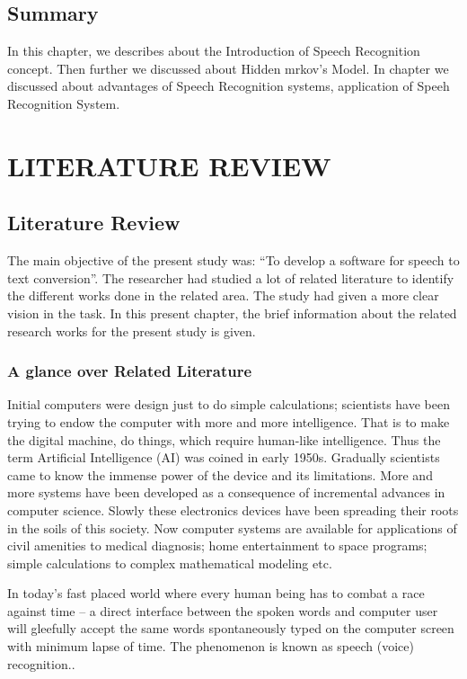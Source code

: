 \documentclass[12pt,a4paper,oldfontcommands]{memoir}
\begin{document}
\section{Summary}
In this chapter, we describes about the Introduction of Speech Recognition concept. Then further we discussed about Hidden mrkov's Model. In chapter we discussed about advantages of Speech Recognition systems, application of Speeh Recognition System.

\chapter{LITERATURE REVIEW}
\section{Literature Review}
The main objective of the present study was: “To develop a software for speech to
text conversion”. The researcher had studied a lot of related literature to identify the
different works done in the related area. The study had given a more clear vision in
the task. In this present chapter, the brief information about the related research works
for the present study is given.
\subsection{A glance over Related Literature}
Initial computers were design just to do simple calculations; scientists have been
trying to endow the computer with more and more intelligence. That is to make the
digital machine, do things, which require human-like intelligence. Thus the term
Artificial Intelligence (AI) was coined in early 1950s. Gradually scientists came to
know the immense power of the device and its limitations. More and more systems
have been developed as a consequence of incremental advances in computer science.
Slowly these electronics devices have been spreading their roots in the soils of this
society. Now computer systems are available for applications of civil amenities to
medical diagnosis; home entertainment to space programs; simple calculations to
complex mathematical modeling etc\cite{21}.

In today’s fast placed world where every human being has to combat a race against
time – a direct interface between the spoken words and computer user will gleefully
accept the same words spontaneously typed on the computer screen with minimum
lapse of time. The phenomenon is known as speech (voice) recognition.\cite{21}.
\end{document}
